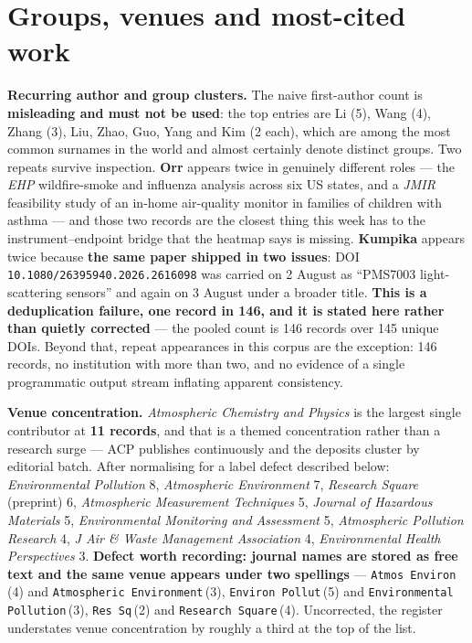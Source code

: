 \documentclass[10pt]{article}
\begin{document}
\clearpage

\section*{\sffamily\bfseries\color{Deep}Groups, venues and most-cited work}
\vspace{-1.5mm}{\color{Teal}\rule{\linewidth}{1.1pt}}\vspace{2.5mm}

\footnotesize
\textbf{Recurring author and group clusters.} The naive first-author count is
\textbf{misleading and must not be used}: the top entries are Li (5), Wang (4), Zhang (3),
Liu, Zhao, Guo, Yang and Kim (2 each), which are among the most common surnames in the
world and almost certainly denote distinct groups. Two repeats survive inspection.
\textbf{Orr} appears twice in genuinely different roles --- the \textit{EHP} wildfire-smoke
and influenza analysis across six US states, and a \textit{JMIR} feasibility study of an
in-home air-quality monitor in families of children with asthma --- and those two records
are the closest thing this week has to the instrument--endpoint bridge that the heatmap
says is missing. \textbf{Kumpika} appears twice because \textbf{the same paper shipped in
two issues}: DOI \texttt{10.1080/26395940.2026.2616098} was carried on 2 August as
``PMS7003 light-scattering sensors'' and again on 3 August under a broader title.
\textbf{This is a deduplication failure, one record in 146, and it is stated here rather
than quietly corrected} --- the pooled count is 146 records over 145 unique DOIs.
Beyond that, repeat appearances in this corpus are the exception: 146 records, no
institution with more than two, and no evidence of a single programmatic output stream
inflating apparent consistency.

\vspace{2mm}
\textbf{Venue concentration.} \textit{Atmospheric Chemistry and Physics} is the largest
single contributor at \textbf{11 records}, and that is a themed concentration rather than
a research surge --- ACP publishes continuously and the deposits cluster by editorial
batch. After normalising for a label defect described below: \textit{Environmental
Pollution} 8, \textit{Atmospheric Environment} 7, \textit{Research Square} (preprint) 6,
\textit{Atmospheric Measurement Techniques} 5, \textit{Journal of Hazardous Materials} 5,
\textit{Environmental Monitoring and Assessment} 5, \textit{Atmospheric Pollution
Research} 4, \textit{J Air \& Waste Management Association} 4, \textit{Environmental
Health Perspectives} 3. \textbf{Defect worth recording: journal names are stored as free
text and the same venue appears under two spellings} --- \texttt{Atmos Environ}\,(4) and
\texttt{Atmospheric Environment}\,(3), \texttt{Environ Pollut}\,(5) and
\texttt{Environmental Pollution}\,(3), \texttt{Res Sq}\,(2) and \texttt{Research
Square}\,(4). Uncorrected, the register understates venue concentration by roughly a
third at the top of the list.
\end{document}
